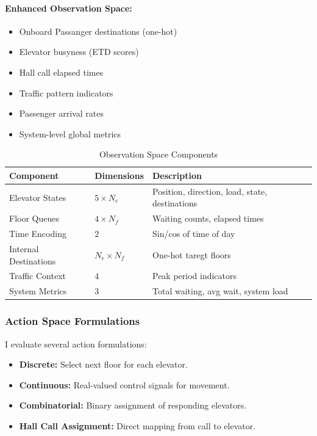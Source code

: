 \documentclass[10pt,twocolumn]{article}
\begin{document}
\paragraph{Enhanced Observation Space:}
\begin{itemize}
    \item Onboard Passanger destinations (one-hot)
    \item Elevator busyness (ETD scores)
    \item Hall call elapsed times
    \item Traffic pattern indicators
    \item Passenger arrival rates
    \item System-level global metrics
\end{itemize}

\begin{table}[h!]
\centering
\caption{Observation Space Components}
\begin{tabular}{|p{2cm}lp{2.5cm}|}
\toprule
\textbf{Component} & \textbf{Dimensions} & \textbf{Description} \\ \midrule
Elevator States & $5 \times N_e$ & Position, direction, load, state, destinations \\
\hline
Floor Queues & $4 \times N_f$ & Waiting counts, elapsed times \\
\hline
Time Encoding & $2$ & Sin/cos of time of day \\
\hline
Internal Destinations & $N_e \times N_f$ & One-hot taregt floors \\
\hline
Traffic Context & $4$ & Peak period indicators \\
\hline
System Metrics & $3$ & Total waiting, avg wait, system load \\
\bottomrule
\end{tabular}
\end{table}

\subsubsection{Action Space Formulations}

I evaluate several action formulations:

\begin{itemize}
    \item \textbf{Discrete:} Select next floor for each elevator.
    \item \textbf{Continuous:} Real-valued control signals for movement.
    \item \textbf{Combinatorial:} Binary assignment of responding elevators.
    \item \textbf{Hall Call Assignment:} Direct mapping from call to elevator.
\end{itemize}
\end{document}
